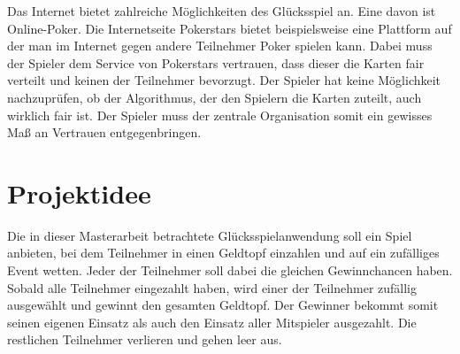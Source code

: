 Das Internet bietet zahlreiche Möglichkeiten des Glücksspiel an. Eine davon ist Online-Poker. Die Internetseite Pokerstars \cite{pokerstars} bietet beispielsweise eine Plattform auf der man im Internet gegen andere Teilnehmer Poker spielen kann. Dabei muss der Spieler dem Service von Pokerstars vertrauen, dass dieser die Karten fair verteilt und keinen der Teilnehmer bevorzugt. Der Spieler hat keine Möglichkeit nachzuprüfen, ob der Algorithmus, der den Spielern die Karten zuteilt, auch wirklich fair ist. Der Spieler muss der zentrale Organisation somit ein gewisses Maß an Vertrauen entgegenbringen. 








\section{Projektidee}

Die in dieser Masterarbeit betrachtete Glücksspielanwendung soll ein Spiel anbieten, bei dem Teilnehmer in einen Geldtopf einzahlen und auf ein zufälliges Event wetten. Jeder der Teilnehmer soll dabei die gleichen Gewinnchancen haben. Sobald alle Teilnehmer eingezahlt haben, wird einer der Teilnehmer zufällig ausgewählt und gewinnt den gesamten Geldtopf. Der Gewinner bekommt somit seinen eigenen Einsatz als auch den Einsatz aller Mitspieler ausgezahlt. Die restlichen Teilnehmer verlieren und gehen leer aus.

